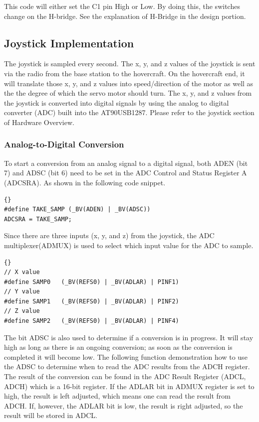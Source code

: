 This code will either set the C1 pin High or Low. By doing this, the switches change on the H-bridge. See the explanation of H-Bridge in the design portion. 

\subsection{Joystick Implementation}
The joystick is sampled every second. The x, y, and z values of the joystick is sent via the radio from the base station to the hovercraft. On the hovercraft end, it will translate those x, y, and z values into speed/direction of the motor as well as the the degree of which the servo motor should turn. The x, y, and z values from the joystick is converted into digital signals by using the analog to digital converter (ADC) built into the AT90USB1287. Please refer to the joystick section of Hardware Overview.

\subsubsection{Analog-to-Digital Conversion}
To start a conversion from an analog signal to a digital signal, both ADEN (bit 7) and ADSC (bit 6) need to be set in the ADC Control and Status Register A (ADCSRA). As shown in the following code snippet.
\lstset{language=c}
\lstset{commentstyle=\textit}
\begin{lstlisting}[frame=trbl]{}
#define TAKE_SAMP (_BV(ADEN) | _BV(ADSC))
ADCSRA = TAKE_SAMP;
\end{lstlisting}

Since there are three inputs (x, y, and z) from the joystick,  the ADC multiplexer(ADMUX) is used to select which input value for the ADC to sample.

\lstset{language=c}
\lstset{commentstyle=\textit}
\begin{lstlisting}[frame=trbl]{}
// X value
#define SAMP0 	(_BV(REFS0) | _BV(ADLAR) | PINF1)
// Y value
#define SAMP1 	(_BV(REFS0) | _BV(ADLAR) | PINF2)
// Z value
#define SAMP2 	(_BV(REFS0) | _BV(ADLAR) | PINF4)
\end{lstlisting}

The bit ADSC is also used to determine if a conversion is in progress. It will stay high as long as there is an ongoing conversion; as soon as the conversion is completed it will become low. The following function demonstration how to use the ADSC to determine when to read the ADC results from the ADCH register. The result of the conversion can be found in the ADC Result Register (ADCL, ADCH) which is a 16-bit register. If the ADLAR bit in ADMUX register is set to high, the result is left adjusted, which means one can read the result from ADCH. If, however, the ADLAR bit is low, the result is right adjusted, so the result will be stored in ADCL.

